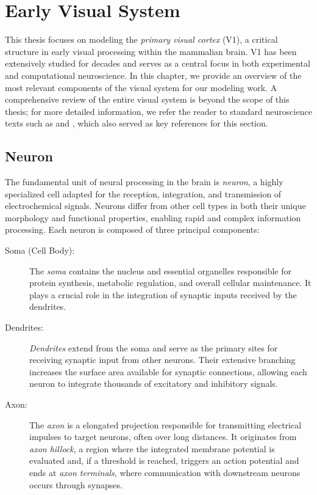\chapter{Early Visual System}
\label{chap:visual_system}
This thesis focuses on modeling the \emph{primary visual cortex} (V1), a critical structure in early visual processing within the mammalian brain. V1 has been extensively studied for decades \citep{hubel1965receptive} and serves as a central focus in both experimental and computational neuroscience. In this chapter, we provide an overview of the most relevant components of the visual system for our modeling work. A comprehensive review of the entire visual system is beyond the scope of this thesis; for more detailed information, we refer the reader to standard neuroscience texts such as \citet{bear2020neuroscience} and \citet{goebel2004visual}, which also served as key references for this section.

\section{Neuron}
\label{sec:neuron}

The fundamental unit of neural processing in the brain is \emph{neuron}, a highly specialized cell adapted for the reception, integration, and transmission of electrochemical signals. Neurons differ from other cell types in both their unique morphology and functional properties, enabling rapid and complex information processing. Each neuron is composed of three principal components:

\begin{description}
    \item[Soma (Cell Body):] The \emph{soma} contains the nucleus and essential organelles responsible for protein synthesis, metabolic regulation, and overall cellular maintenance. It plays a crucial role in the integration of synaptic inputs received by the dendrites.

    \item[Dendrites:] \emph{Dendrites} extend from the soma and serve as the primary sites for receiving synaptic input from other neurons. Their extensive branching increases the surface area available for synaptic connections, allowing each neuron to integrate thousands of excitatory and inhibitory signals.

    \item[Axon:] The \emph{axon} is a  elongated projection responsible for transmitting electrical impulses to target neurons, often over long distances. It originates from \emph{axon hillock}, a region where the integrated membrane potential is evaluated and, if a threshold is reached, triggers an action potential and ends at \emph{axon terminals}, where communication with downstream neurons occurs through synapses.
\end{description}

